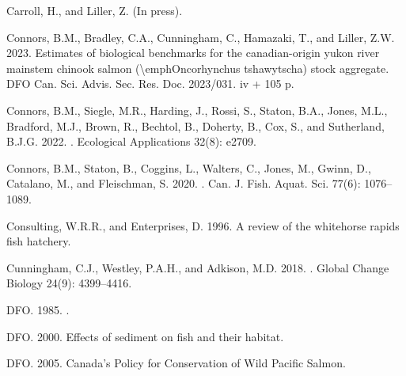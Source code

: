 \documentclass[11pt]{book}
\begin{document}
\begin{CSLReferences}{1}{0}
%
Carroll, H., and Liller, Z. (In press). 

%
Connors, B.M., Bradley, C.A., Cunningham, C., Hamazaki, T., and Liller, Z.W. 2023. Estimates of biological benchmarks for the canadian-origin yukon river mainstem chinook salmon ({\textbackslash{}}{emphOncorhynchus} tshawytscha) stock aggregate. {DFO} Can. Sci. Advis. Sec. Res. Doc. 2023/031. iv + 105 p.

%
Connors, B.M., Siegle, M.R., Harding, J., Rossi, S., Staton, B.A., Jones, M.L., Bradford, M.J., Brown, R., Bechtol, B., Doherty, B., Cox, S., and Sutherland, B.J.G. 2022. . Ecological Applications 32(8): e2709.

%
Connors, B.M., Staton, B., Coggins, L., Walters, C., Jones, M., Gwinn, D., Catalano, M., and Fleischman, S. 2020. . Can. J. Fish. Aquat. Sci. 77(6): 1076--1089.

%
Consulting, W.R.R., and Enterprises, D. 1996. A review of the whitehorse rapids fish hatchery.

%
Cunningham, C.J., Westley, P.A.H., and Adkison, M.D. 2018. . Global Change Biology 24(9): 4399--4416.

%
DFO. 1985. .

%
DFO. 2000. Effects of sediment on fish and their habitat.

%
DFO. 2005. {Canada's Policy for Conservation of Wild Pacific Salmon}.


\end{CSLReferences}
\end{document}
